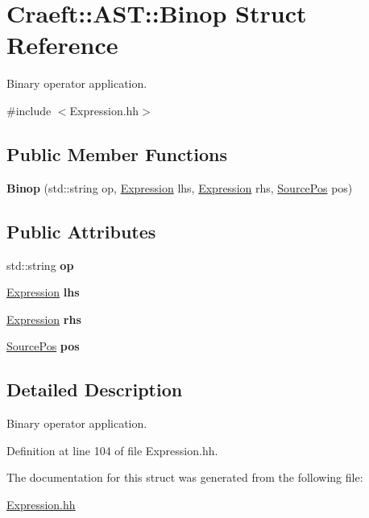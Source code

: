 \hypertarget{struct_craeft_1_1_a_s_t_1_1_binop}{}\section{Craeft\+:\+:A\+ST\+:\+:Binop Struct Reference}
\label{struct_craeft_1_1_a_s_t_1_1_binop}


Binary operator application.  




{\ttfamily \#include $<$Expression.\+hh$>$}

\subsection*{Public Member Functions}
\begin{DoxyCompactItemize}
\item 
\hypertarget{struct_craeft_1_1_a_s_t_1_1_binop_ac5de457f8ffa1b7e049636ca1766444f}{}\label{struct_craeft_1_1_a_s_t_1_1_binop_ac5de457f8ffa1b7e049636ca1766444f} 
{\bfseries Binop} (std\+::string op, \hyperlink{_expression_8hh_aef28cabf6d8e7cb8324232e27e69606d}{Expression} lhs, \hyperlink{_expression_8hh_aef28cabf6d8e7cb8324232e27e69606d}{Expression} rhs, \hyperlink{struct_craeft_1_1_source_pos}{Source\+Pos} pos)
\end{DoxyCompactItemize}
\subsection*{Public Attributes}
\begin{DoxyCompactItemize}
\item 
\hypertarget{struct_craeft_1_1_a_s_t_1_1_binop_a84a57322d7117fcf8f7cd308db30a58e}{}\label{struct_craeft_1_1_a_s_t_1_1_binop_a84a57322d7117fcf8f7cd308db30a58e} 
std\+::string {\bfseries op}
\item 
\hypertarget{struct_craeft_1_1_a_s_t_1_1_binop_ae6942fdd35f86322bbeef3071a85fd7c}{}\label{struct_craeft_1_1_a_s_t_1_1_binop_ae6942fdd35f86322bbeef3071a85fd7c} 
\hyperlink{_expression_8hh_aef28cabf6d8e7cb8324232e27e69606d}{Expression} {\bfseries lhs}
\item 
\hypertarget{struct_craeft_1_1_a_s_t_1_1_binop_a958de46985886bfe01f5459938b247f0}{}\label{struct_craeft_1_1_a_s_t_1_1_binop_a958de46985886bfe01f5459938b247f0} 
\hyperlink{_expression_8hh_aef28cabf6d8e7cb8324232e27e69606d}{Expression} {\bfseries rhs}
\item 
\hypertarget{struct_craeft_1_1_a_s_t_1_1_binop_aed1d3282f356adbefa8bd0273340b7f2}{}\label{struct_craeft_1_1_a_s_t_1_1_binop_aed1d3282f356adbefa8bd0273340b7f2} 
\hyperlink{struct_craeft_1_1_source_pos}{Source\+Pos} {\bfseries pos}
\end{DoxyCompactItemize}


\subsection{Detailed Description}
Binary operator application. 

Definition at line 104 of file Expression.\+hh.



The documentation for this struct was generated from the following file\+:\begin{DoxyCompactItemize}
\item 
\hyperlink{_expression_8hh}{Expression.\+hh}\end{DoxyCompactItemize}
